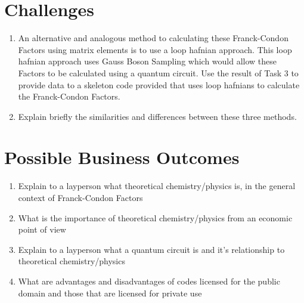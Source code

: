 \documentclass[12pt]{article}
\begin{document}
\section*{Challenges}

\begin{enumerate}
    \item An alternative and analogous method to calculating these Franck-Condon Factors using matrix elements is to use a loop hafnian approach. This loop hafnian approach uses Gauss Boson Sampling which would allow these Factors to be calculated using a quantum circuit. Use the result of Task 3 to provide data to a skeleton code provided that uses loop hafnians to calculate the Franck-Condon Factors.
    \item Explain briefly the similarities and differences between these three methods.
\end{enumerate}

\section*{Possible Business Outcomes}

\begin{enumerate}
    \item Explain to a layperson what theoretical chemistry/physics is, in the general context of Franck-Condon Factors
    \item What is the importance of theoretical chemistry/physics from an economic point of view
    \item Explain to a layperson what a quantum circuit is and it's relationship to theoretical chemistry/physics
    \item What are advantages and disadvantages of codes licensed for the public domain and those that are licensed for private use
\end{enumerate}

\newpage



\end{document}
